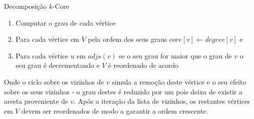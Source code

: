 \begin{algorithm}
\caption{Decomposição $k$-Core}
\begin{enumerate}
	\item Computar o grau de cada vértice
	\item Para cada vértice em $V$ pela ordem dos seus graus $core[v] \gets degree[v]$ e
	\item Para cada vértice $u$ em $adjs(v)$ se o seu grau for maior que o grau de $v$ o seu grau é decrementando e $V$ é reordenado de acordo
\end{enumerate}
\end{algorithm}

Onde o ciclo sobre os vizinhos de $v$ simula a remoção deste vértice e o seu efeito sobre os seus vizinhos - o grau destes é reduzido por um pois deixa de existir a aresta proveniente de $v$.
Após a iteração da lista de vizinhos, os restantes vértices em $V$ devem ser reordenados de modo a garantir a ordem crescente.


